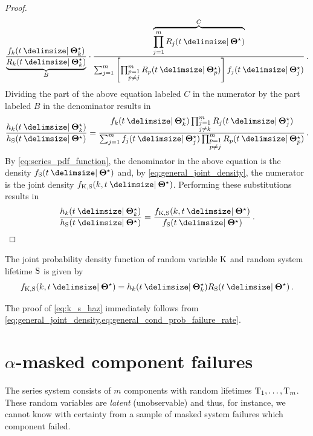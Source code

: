 \documentclass[
    11pt,
    extrafontsizes,
    article,
    oldfontcommands,
    final,
    oneside,
    openany,
    hidelinks]{memoir}
\begin{document}
\begin{proof}
\begin{equation}
    \frac{\pdf_k(t \Given \tparam{\sysparam}_k)}{\underbrace{\srv_k(t \Given \tparam{\sysparam}_k)}_{B}} \cdot
    \frac{\overbrace{\prod_{j=1}^{m} \srv_j(t \Given \tparam{\sysparam})}^{C} }{\sum_{j=1}^{m} \left [ \prod_{\substack{p=1\\p \neq j}}^{m} \srv_p(t \Given \tparam{\sysparam}_p) \right ] \pdf_j(t \Given \tparam{\sysparam}_j)}\,.
\end{equation}
Dividing the part of the above equation labeled $C$ in the numerator by the part labeled $B$ in the denominator results in
\begin{equation}
    \frac{\haz_k(t \Given \tparam{\sysparam}_k)}{\haz_{\sv}(t \Given \tparam{\sysparam})} = \frac{\pdf_k(t \Given \tparam{\sysparam}_k) \prod_{\substack{j=1\\j \neq k}}^{m} \srv_j(t \Given \tparam{\sysparam}_j)} {\sum_{j=1}^{m} \pdf_j(t \Given \tparam{\sysparam}_j) \prod_{\substack{p=1\\p \neq j}}^{m} \srv_p(t \Given \tparam{\sysparam}_p)}\,.
\end{equation}
By \cref{eq:series_pdf_function}, the denominator in the above equation is the density $\spdf(t \Given \tparam\sysparam)$ and, by \cref{eq:general_joint_density}, the numerator is the joint density $\pdf_{\RV{K}, \sv}(k, t \Given \tparam\sysparam)$. Performing these substitutions results in
\begin{equation}
\frac{\haz_k(t \Given \tparam{\sysparam}_k)}{\haz_{\sv}(t \Given \tparam\sysparam)} = \frac{\pdf_{\RV{K}, \sv}(k, t \Given \tparam\sysparam)}{\spdf(t \Given \tparam\sysparam)}\,.
\end{equation}
\end{proof}
\begin{corollary}
The joint probability density function of random variable $\mathrm{K}$ and random system lifetime $\mathrm{S}$ is given by
\begin{equation}
\label{eq:k_s_haz}
    \pdf_{\RV{K}, \sv}(k, t\Given \tparam\sysparam) = \haz_k(t \Given \tparam{\sysparam}_k) \srv_{\sv}(t \Given \tparam\sysparam)\,.
\end{equation}
\end{corollary}
The proof of \cref{eq:k_s_haz} immediately follows from \cref{eq:general_joint_density,eq:general_cond_prob_failure_rate}.

\section{$\alpha$-masked component failures}
\label{sec:cand_sel}
The series system consists of $m$ components with random lifetimes $\mathrm{T}_1,\ldots,\mathrm{T}_m$.
These random variables are \emph{latent} (unobservable) and thus, for instance, we cannot know with certainty from a sample of masked system failures which component failed.
\end{document}
